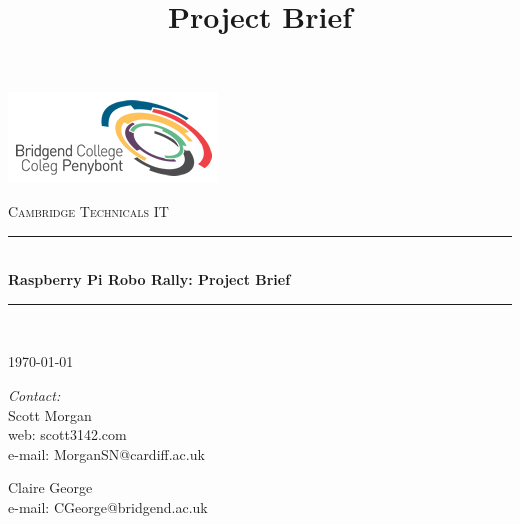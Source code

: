 \documentclass[10pt]{article}
\title{Project Brief}
\begin{document}
	\begin{center}																		%
		\newcommand{\HRule}{\rule{\linewidth}{0.5mm}}									%
			\begin{flushright}
				\includegraphics[scale = 1]{bcoll.png}
		\end{flushright}
		
		\vspace*{3cm}								%
		\textsc{\huge Cambridge Technicals IT}\\[1.5cm]
		
		\vspace{3cm}											%
		\HRule \\[0.4cm]																	%
		{ \huge \bfseries Raspberry Pi Robo Rally: Project Brief}\\[0.4cm]	%
		\HRule \\[1.5cm]																	%
		
		\vspace{2cm} 																				
		\begin{center}																					
			{\large \today}																	%
		\end{center}												  						
	\end{center}	
	\vspace*{3cm}																			
	
	\begin{minipage}{0.52\textwidth}													%
		\begin{flushleft} \large															%
			\emph{Contact: %
			}\\	
			Scott Morgan\\
			web: scott3142.com\\
			e-mail: MorganSN@cardiff.ac.uk\\
		\end{flushleft}																		%
	\end{minipage}
	\begin{minipage}{0.46\textwidth}	
		\begin{flushright} \large															%
			Claire George\\
			e-mail: CGeorge@bridgend.ac.uk\\
		\end{flushright}																		%
	\end{minipage}
	
\end{document}
